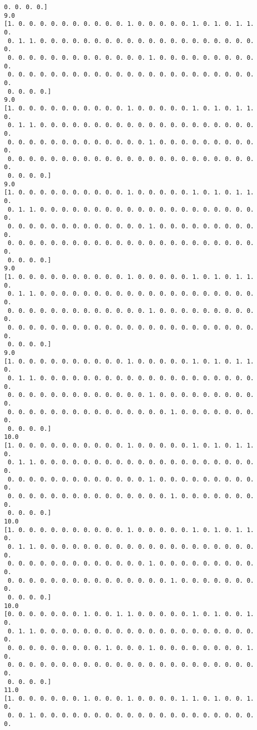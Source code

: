 \documentclass[11pt]{article}
\begin{document}
\begin{Verbatim}[commandchars=\\\{\}]
 0. 0. 0. 0.]
9.0
[1. 0. 0. 0. 0. 0. 0. 0. 0. 0. 0. 1. 0. 0. 0. 0. 0. 1. 0. 1. 0. 1. 1. 0.
 0. 1. 1. 0. 0. 0. 0. 0. 0. 0. 0. 0. 0. 0. 0. 0. 0. 0. 0. 0. 0. 0. 0. 0.
 0. 0. 0. 0. 0. 0. 0. 0. 0. 0. 0. 0. 0. 1. 0. 0. 0. 0. 0. 0. 0. 0. 0. 0.
 0. 0. 0. 0. 0. 0. 0. 0. 0. 0. 0. 0. 0. 0. 0. 0. 0. 0. 0. 0. 0. 0. 0. 0.
 0. 0. 0. 0.]
9.0
[1. 0. 0. 0. 0. 0. 0. 0. 0. 0. 0. 1. 0. 0. 0. 0. 0. 1. 0. 1. 0. 1. 1. 0.
 0. 1. 1. 0. 0. 0. 0. 0. 0. 0. 0. 0. 0. 0. 0. 0. 0. 0. 0. 0. 0. 0. 0. 0.
 0. 0. 0. 0. 0. 0. 0. 0. 0. 0. 0. 0. 0. 1. 0. 0. 0. 0. 0. 0. 0. 0. 0. 0.
 0. 0. 0. 0. 0. 0. 0. 0. 0. 0. 0. 0. 0. 0. 0. 0. 0. 0. 0. 0. 0. 0. 0. 0.
 0. 0. 0. 0.]
9.0
[1. 0. 0. 0. 0. 0. 0. 0. 0. 0. 0. 1. 0. 0. 0. 0. 0. 1. 0. 1. 0. 1. 1. 0.
 0. 1. 1. 0. 0. 0. 0. 0. 0. 0. 0. 0. 0. 0. 0. 0. 0. 0. 0. 0. 0. 0. 0. 0.
 0. 0. 0. 0. 0. 0. 0. 0. 0. 0. 0. 0. 0. 1. 0. 0. 0. 0. 0. 0. 0. 0. 0. 0.
 0. 0. 0. 0. 0. 0. 0. 0. 0. 0. 0. 0. 0. 0. 0. 0. 0. 0. 0. 0. 0. 0. 0. 0.
 0. 0. 0. 0.]
9.0
[1. 0. 0. 0. 0. 0. 0. 0. 0. 0. 0. 1. 0. 0. 0. 0. 0. 1. 0. 1. 0. 1. 1. 0.
 0. 1. 1. 0. 0. 0. 0. 0. 0. 0. 0. 0. 0. 0. 0. 0. 0. 0. 0. 0. 0. 0. 0. 0.
 0. 0. 0. 0. 0. 0. 0. 0. 0. 0. 0. 0. 0. 1. 0. 0. 0. 0. 0. 0. 0. 0. 0. 0.
 0. 0. 0. 0. 0. 0. 0. 0. 0. 0. 0. 0. 0. 0. 0. 0. 0. 0. 0. 0. 0. 0. 0. 0.
 0. 0. 0. 0.]
9.0
[1. 0. 0. 0. 0. 0. 0. 0. 0. 0. 0. 1. 0. 0. 0. 0. 0. 1. 0. 1. 0. 1. 1. 0.
 0. 1. 1. 0. 0. 0. 0. 0. 0. 0. 0. 0. 0. 0. 0. 0. 0. 0. 0. 0. 0. 0. 0. 0.
 0. 0. 0. 0. 0. 0. 0. 0. 0. 0. 0. 0. 0. 1. 0. 0. 0. 0. 0. 0. 0. 0. 0. 0.
 0. 0. 0. 0. 0. 0. 0. 0. 0. 0. 0. 0. 0. 0. 0. 1. 0. 0. 0. 0. 0. 0. 0. 0.
 0. 0. 0. 0.]
10.0
[1. 0. 0. 0. 0. 0. 0. 0. 0. 0. 0. 1. 0. 0. 0. 0. 0. 1. 0. 1. 0. 1. 1. 0.
 0. 1. 1. 0. 0. 0. 0. 0. 0. 0. 0. 0. 0. 0. 0. 0. 0. 0. 0. 0. 0. 0. 0. 0.
 0. 0. 0. 0. 0. 0. 0. 0. 0. 0. 0. 0. 0. 1. 0. 0. 0. 0. 0. 0. 0. 0. 0. 0.
 0. 0. 0. 0. 0. 0. 0. 0. 0. 0. 0. 0. 0. 0. 0. 1. 0. 0. 0. 0. 0. 0. 0. 0.
 0. 0. 0. 0.]
10.0
[1. 0. 0. 0. 0. 0. 0. 0. 0. 0. 0. 1. 0. 0. 0. 0. 0. 1. 0. 1. 0. 1. 1. 0.
 0. 1. 1. 0. 0. 0. 0. 0. 0. 0. 0. 0. 0. 0. 0. 0. 0. 0. 0. 0. 0. 0. 0. 0.
 0. 0. 0. 0. 0. 0. 0. 0. 0. 0. 0. 0. 0. 1. 0. 0. 0. 0. 0. 0. 0. 0. 0. 0.
 0. 0. 0. 0. 0. 0. 0. 0. 0. 0. 0. 0. 0. 0. 0. 1. 0. 0. 0. 0. 0. 0. 0. 0.
 0. 0. 0. 0.]
10.0
[0. 0. 0. 0. 0. 0. 0. 1. 0. 0. 1. 1. 0. 0. 0. 0. 0. 1. 0. 1. 0. 0. 1. 0.
 0. 1. 1. 0. 0. 0. 0. 0. 0. 0. 0. 0. 0. 0. 0. 0. 0. 0. 0. 0. 0. 0. 0. 0.
 0. 0. 0. 0. 0. 0. 0. 0. 0. 1. 0. 0. 0. 1. 0. 0. 0. 0. 0. 0. 0. 0. 1. 0.
 0. 0. 0. 0. 0. 0. 0. 0. 0. 0. 0. 0. 0. 0. 0. 0. 0. 0. 0. 0. 0. 0. 0. 0.
 0. 0. 0. 0.]
11.0
[1. 0. 0. 0. 0. 0. 0. 1. 0. 0. 0. 1. 0. 0. 0. 0. 1. 1. 0. 1. 0. 0. 1. 0.
 0. 0. 1. 0. 0. 0. 0. 0. 0. 0. 0. 0. 0. 0. 0. 0. 0. 0. 0. 0. 0. 0. 0. 0.

\end{Verbatim}
\end{document}
